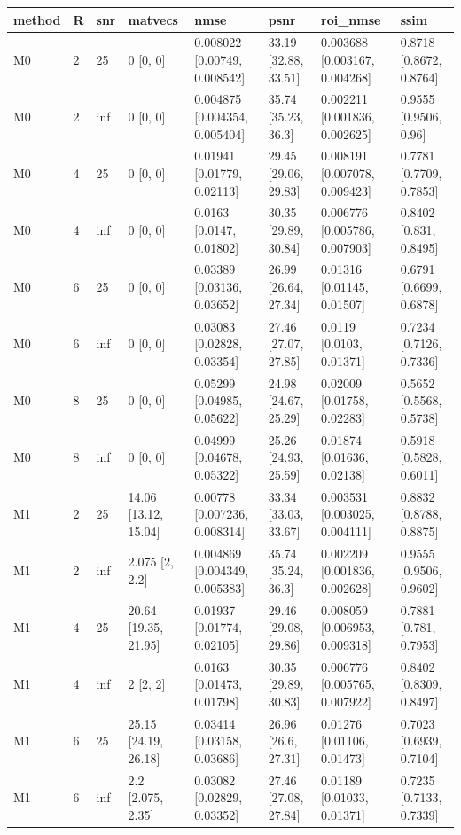 \begin{tabular}{llllllll}
\hline
method & R & snr & matvecs & nmse & psnr & roi\_nmse & ssim \\
\hline
M0 & 2 & 25 & 0 [0, 0] & 0.008022 [0.00749, 0.008542] & 33.19 [32.88, 33.51] & 0.003688 [0.003167, 0.004268] & 0.8718 [0.8672, 0.8764] \\
M0 & 2 & inf & 0 [0, 0] & 0.004875 [0.004354, 0.005404] & 35.74 [35.23, 36.3] & 0.002211 [0.001836, 0.002625] & 0.9555 [0.9506, 0.96] \\
M0 & 4 & 25 & 0 [0, 0] & 0.01941 [0.01779, 0.02113] & 29.45 [29.06, 29.83] & 0.008191 [0.007078, 0.009423] & 0.7781 [0.7709, 0.7853] \\
M0 & 4 & inf & 0 [0, 0] & 0.0163 [0.0147, 0.01802] & 30.35 [29.89, 30.84] & 0.006776 [0.005786, 0.007903] & 0.8402 [0.831, 0.8495] \\
M0 & 6 & 25 & 0 [0, 0] & 0.03389 [0.03136, 0.03652] & 26.99 [26.64, 27.34] & 0.01316 [0.01145, 0.01507] & 0.6791 [0.6699, 0.6878] \\
M0 & 6 & inf & 0 [0, 0] & 0.03083 [0.02828, 0.03354] & 27.46 [27.07, 27.85] & 0.0119 [0.0103, 0.01371] & 0.7234 [0.7126, 0.7336] \\
M0 & 8 & 25 & 0 [0, 0] & 0.05299 [0.04985, 0.05622] & 24.98 [24.67, 25.29] & 0.02009 [0.01758, 0.02283] & 0.5652 [0.5568, 0.5738] \\
M0 & 8 & inf & 0 [0, 0] & 0.04999 [0.04678, 0.05322] & 25.26 [24.93, 25.59] & 0.01874 [0.01636, 0.02138] & 0.5918 [0.5828, 0.6011] \\
M1 & 2 & 25 & 14.06 [13.12, 15.04] & 0.00778 [0.007236, 0.008314] & 33.34 [33.03, 33.67] & 0.003531 [0.003025, 0.004111] & 0.8832 [0.8788, 0.8875] \\
M1 & 2 & inf & 2.075 [2, 2.2] & 0.004869 [0.004349, 0.005383] & 35.74 [35.24, 36.3] & 0.002209 [0.001836, 0.002628] & 0.9555 [0.9506, 0.9602] \\
M1 & 4 & 25 & 20.64 [19.35, 21.95] & 0.01937 [0.01774, 0.02105] & 29.46 [29.08, 29.86] & 0.008059 [0.006953, 0.009318] & 0.7881 [0.781, 0.7953] \\
M1 & 4 & inf & 2 [2, 2] & 0.0163 [0.01473, 0.01798] & 30.35 [29.89, 30.83] & 0.006776 [0.005765, 0.007922] & 0.8402 [0.8309, 0.8497] \\
M1 & 6 & 25 & 25.15 [24.19, 26.18] & 0.03414 [0.03158, 0.03686] & 26.96 [26.6, 27.31] & 0.01276 [0.01106, 0.01473] & 0.7023 [0.6939, 0.7104] \\
M1 & 6 & inf & 2.2 [2.075, 2.35] & 0.03082 [0.02829, 0.03352] & 27.46 [27.08, 27.84] & 0.01189 [0.01033, 0.01371] & 0.7235 [0.7133, 0.7339] \\

\end{tabular}
